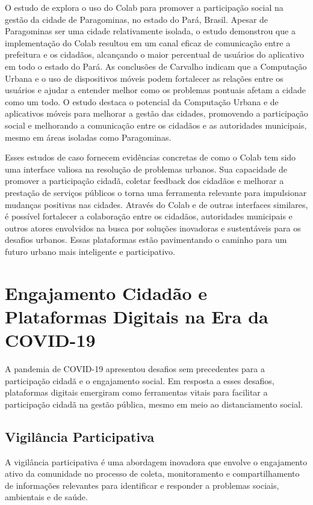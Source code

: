 O estudo de  explora o uso do Colab para promover a participação social na gestão da cidade de Paragominas, no estado do Pará, Brasil. Apesar de Paragominas ser uma cidade relativamente isolada, o estudo demonstrou que a implementação do Colab resultou em um canal eficaz de comunicação entre a prefeitura e os cidadãos, alcançando o maior percentual de usuários do aplicativo em todo o estado do Pará. As conclusões de Carvalho indicam que a Computação Urbana e o uso de dispositivos móveis podem fortalecer as relações entre os usuários e ajudar a entender melhor como os problemas pontuais afetam a cidade como um todo. O estudo destaca o potencial da Computação Urbana e de aplicativos móveis para melhorar a gestão das cidades, promovendo a participação social e melhorando a comunicação entre os cidadãos e as autoridades municipais, mesmo em áreas isoladas como Paragominas.

Esses estudos de caso fornecem evidências concretas de como o Colab tem sido uma interface valiosa na resolução de problemas urbanos. Sua capacidade de promover a participação cidadã, coletar feedback dos cidadãos e melhorar a prestação de serviços públicos o torna uma ferramenta relevante para impulsionar mudanças positivas nas cidades. Através do Colab e de outras interfaces similares, é possível fortalecer a colaboração entre os cidadãos, autoridades municipais e outros atores envolvidos na busca por soluções inovadoras e sustentáveis para os desafios urbanos. Essas plataformas estão pavimentando o caminho para um futuro urbano mais inteligente e participativo.

\section*{Engajamento Cidadão e Plataformas Digitais na Era da COVID-19}
A pandemia de COVID-19 apresentou desafios sem precedentes para a participação cidadã e o engajamento social. Em resposta a esses desafios, plataformas digitais emergiram como ferramentas vitais para facilitar a participação cidadã na gestão pública, mesmo em meio ao distanciamento social.

\subsection*{Vigilância Participativa}
A vigilância participativa é uma abordagem inovadora que envolve o engajamento ativo da comunidade no processo de coleta, monitoramento e compartilhamento de informações relevantes para identificar e responder a problemas sociais, ambientais e de saúde.

